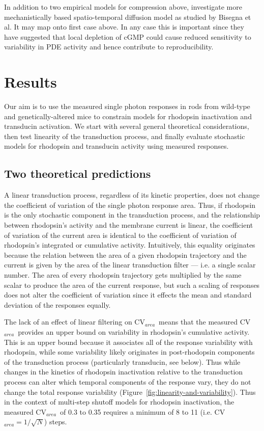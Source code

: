 \documentclass[12pt]{article}
\def\CVArea{CV$_{area}$~}
\begin{document}
In addition to two empirical models for compression above, investigate more mechanistically based spatio-temporal diffusion model as studied by Bisegna et al.  It may map onto first case above.  In any case this is important since they have suggested that local depletion of cGMP could cause reduced sensitivity to variability in PDE activity and hence contribute to reproducibility.


 
\section{Results}

Our aim is to use the measured single photon responses in rods from wild-type and genetically-altered mice to constrain models for rhodopsin inactivation and transducin activation.  We start with several general theoretical considerations, then test linearity of the transduction process, and finally evaluate stochastic models for rhodopsin and transducin activity using measured responses.  
 
\subsection{Two theoretical predictions}

A linear transduction process, regardless of its kinetic properties, does not change the coefficient of variation of the single photon response area.  Thus, if rhodopsin is the only stochastic component in the transduction process, and the relationship between rhodopsin's activity and the membrane current is linear, the coefficient of variation of the current area is identical to the coefficient of variation of rhodopsin's integrated or cumulative activity.  Intuitively, this equality originates because the relation between the area of a given rhodopsin trajectory and the current is given by the area of the linear transduction filter --- i.e. a single scalar number.  The area of every rhodopsin trajectory gets multiplied by the same scalar to produce the area of the current response, but such a scaling of responses does not alter the coefficient of variation since it effects the mean and standard deviation of the responses equally.  

The lack of an effect of linear filtering on \CVArea means that the measured \CVArea provides an upper bound on variability in rhodopsin's cumulative activity.   This is an upper bound because it associates all of the response variability with rhodopsin, while some variability likely originates in post-rhodopsin components of the transduction process (particularly transducin, see below).  Thus while changes in the kinetics of rhodopsin inactivation relative to the transduction process can alter which temporal components of the response vary, they do not change the total response variability (Figure~\ref{fig:linearity-and-variability}).  Thus in the context of multi-step shutoff models for rhodopsin inactivation, the measured \CVArea of 0.3 to 0.35 requires a minimum of 8 to 11 (i.e. CV$_{area} = 1/\sqrt{N}$) steps. 
\end{document}
